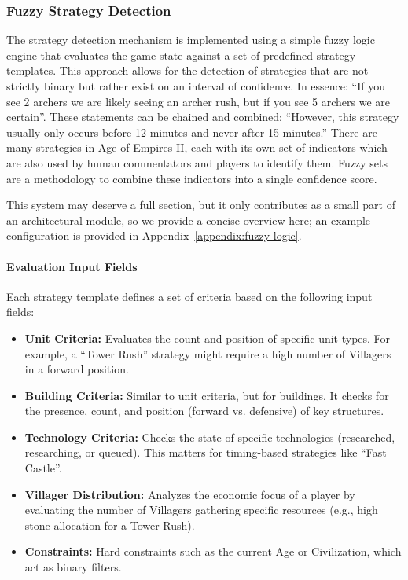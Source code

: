 \subsubsection{Fuzzy Strategy Detection}
The strategy detection mechanism is implemented using a simple fuzzy logic engine that evaluates the game state against a set of predefined strategy templates. This approach allows for the detection of strategies that are not strictly binary but rather exist on an interval of confidence. In essence: ``If you see 2 archers we are likely seeing an archer rush, but if you see 5 archers we are certain''. These statements can be chained and combined: ``However, this strategy usually only occurs before 12 minutes and never after 15 minutes.'' There are many strategies in Age of Empires II, each with its own set of indicators which are also used by human commentators and players to identify them. Fuzzy sets are a methodology to combine these indicators into a single confidence score.

This system may deserve a full section, but it only contributes as a small part of an architectural module, so we provide a concise overview here; an example configuration is provided in Appendix~\ref{appendix:fuzzy-logic}.

\paragraph{Evaluation Input Fields}
Each strategy template defines a set of criteria based on the following input fields:
\begin{itemize}
  \item \textbf{Unit Criteria:} Evaluates the count and position of specific unit types. For example, a ``Tower Rush'' strategy might require a high number of Villagers in a forward position.
  \item \textbf{Building Criteria:} Similar to unit criteria, but for buildings. It checks for the presence, count, and position (forward vs. defensive) of key structures.
  \item \textbf{Technology Criteria:} Checks the state of specific technologies (researched, researching, or queued). This matters for timing-based strategies like ``Fast Castle''.
  \item \textbf{Villager Distribution:} Analyzes the economic focus of a player by evaluating the number of Villagers gathering specific resources (e.g., high stone allocation for a Tower Rush).
  \item \textbf{Constraints:} Hard constraints such as the current Age or Civilization, which act as binary filters.
\end{itemize}

